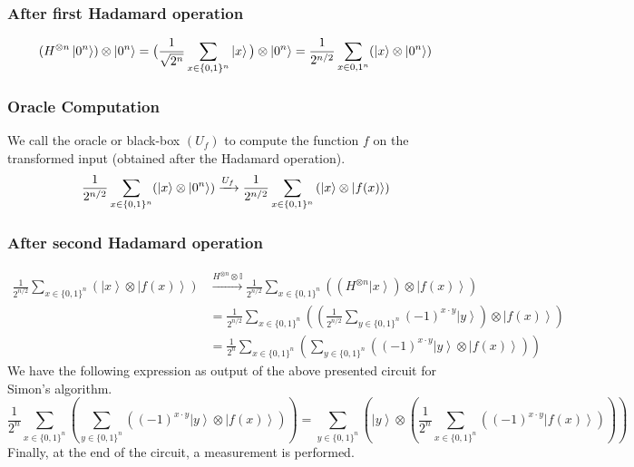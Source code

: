 \documentclass[11.5pt, paper=a4]{article}
\theoremstyle{definition}
\numberwithin{theorem}{section}
\begin{document}
\subsubsection*{After first Hadamard operation}
\begin{equation}
    (H^{\otimes n}\ket{0^n})\otimes\ket{0^n} = \big(\frac{1}{\sqrt{2^n}}\sum_{x \in \{0, 1\}^{n}} \ket{x}\big)\otimes \ket{0^n} = \frac{1}{2^{n/2}} \sum_{x \in {0, 1}^n} (\ket{x} \otimes \ket{0^n})
\end{equation}
\subsubsection*{Oracle Computation}
We call the oracle or black-box $(U_f)$ to compute the function $f$ on the transformed input (obtained after the Hadamard operation).
\begin{equation}
    \frac{1}{2^{n/2}} \sum_{x \in \{0, 1\}^n} (\ket{x} \otimes \ket{0^n}) \xrightarrow{U_f} {\frac {1}{2^{n/2}}}\sum _{x\in \{0,1\}^{n}}\left(\left|x\right\rangle \otimes \left|f(x)\right\rangle \right)
\end{equation}
\subsubsection*{After second Hadamard operation}
\begin{equation*}
    {\begin{aligned} {\frac {1}{2^{n/2}}}\sum _{x\in \{0,1\}^{n}}\left(\left|x\right\rangle \otimes \left|f(x)\right\rangle \right) &\xrightarrow{H^{\otimes n} \otimes \mathbb{I}} {\frac {1}{2^{n/2}}}\sum _{x\in \{0,1\}^{n}}\left(\left(H^{\otimes n}\left|x\right\rangle \right)\otimes \left|f(x)\right\rangle \right)\\[4pt] &={\frac {1}{2^{n/2}}}\sum _{x\in \{0,1\}^{n}}\left(\left({\frac {1}{2^{n/2}}}\sum _{y\in \{0,1\}^{n}}(-1)^{x\cdot y}\left|y\right\rangle \right)\otimes \left|f(x)\right\rangle \right)\\[4pt] &={\frac {1}{2^{n}}}\sum _{x\in \{0,1\}^{n}}\left(\sum _{y\in \{0,1\}^{n}}\left((-1)^{x\cdot y}\left|y\right\rangle \otimes \left|f(x)\right\rangle \right)\right)\end{aligned}}
\end{equation*}
\newline
We have the following expression as output of the above presented circuit for Simon's algorithm.
\begin{equation*}
    {\frac {1}{2^{n}}}\sum _{x\in \{0,1\}^{n}}\left(\sum _{y\in \{0,1\}^{n}}\left((-1)^{x\cdot y}\left|y\right\rangle \otimes \left|f(x)\right\rangle \right)\right) = \sum _{y\in \{0,1\}^{n}}\left(\left|y\right\rangle \otimes \left({\frac {1}{2^{n}}}\sum _{x\in \{0,1\}^{n}}\left((-1)^{x\cdot y}\left|f(x)\right\rangle \right)\right)\right)
\end{equation*}
Finally, at the end of the circuit, a measurement is performed.
\end{document}
